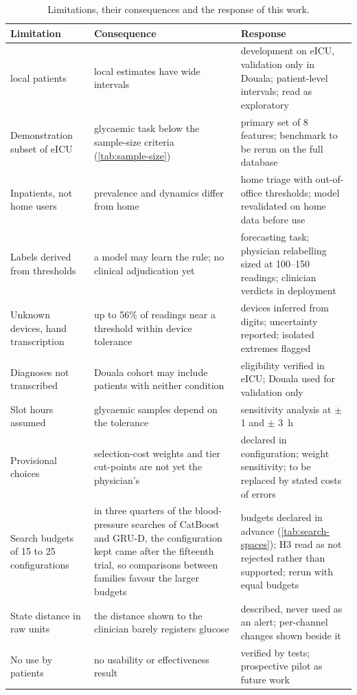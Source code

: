 \documentclass[11pt,a4paper,oneside]{report}
\begin{document}
\begin{table}[htbp]
\centering\footnotesize
\caption{Limitations, their consequences and the response of this work.}\label{tab:limitations}
\begin{tabularx}{\textwidth}{@{}>{\raggedright\arraybackslash}p{3.4cm} >{\raggedright\arraybackslash}X >{\raggedright\arraybackslash}X@{}}
\toprule
\textbf{Limitation} & \textbf{Consequence} & \textbf{Response} \\
\midrule
32 local patients & local estimates have wide intervals & development on eICU, validation only in Douala; patient-level intervals; read as exploratory \\
Demonstration subset of eICU & glycaemic task below the sample-size criteria (\cref{tab:sample-size}) & primary set of 8 features; benchmark to be rerun on the full database \\
Inpatients, not home users & prevalence and dynamics differ from home & home triage with out-of-office thresholds; model revalidated on home data before use \\
Labels derived from thresholds & a model may learn the rule; no clinical adjudication yet & forecasting task; physician relabelling sized at 100--150 readings; clinician verdicts in deployment \\
Unknown devices, hand transcription & up to 56\% of readings near a threshold within device tolerance & devices inferred from digits; uncertainty reported; isolated extremes flagged \\
Diagnoses not transcribed & Douala cohort may include patients with neither condition & eligibility verified in eICU; Douala used for validation only \\
Slot hours assumed & glycaemic samples depend on the tolerance & sensitivity analysis at $\pm$ 1 and $\pm$ 3~h \\
Provisional choices & selection-cost weights and tier cut-points are not yet the physician's & declared in configuration; weight sensitivity; to be replaced by stated costs of errors \\
Search budgets of 15 to 25 configurations & in three quarters of the blood-pressure searches of CatBoost and GRU-D, the configuration kept came after the fifteenth trial, so comparisons between families favour the larger budgets & budgets declared in advance (\cref{tab:search-spaces}); H3 read as not rejected rather than supported; rerun with equal budgets \\
State distance in raw units & the distance shown to the clinician barely registers glucose & described, never used as an alert; per-channel changes shown beside it \\
No use by patients & no usability or effectiveness result & verified by tests; prospective pilot as future work \\
\bottomrule
\end{tabularx}
\end{table}
\end{document}
